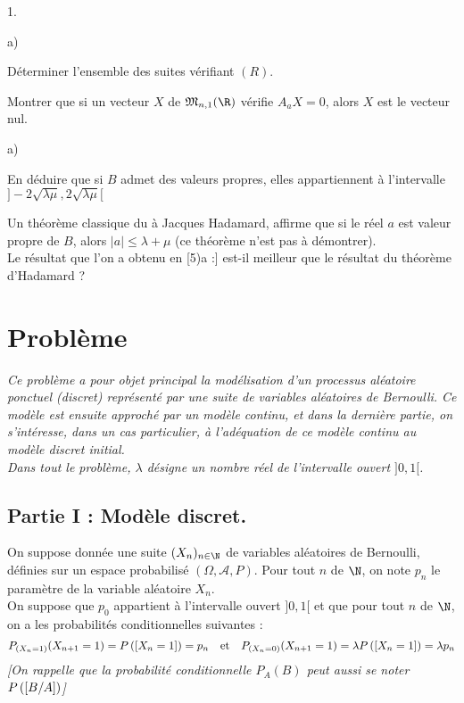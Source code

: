 \documentclass[11pt]{article}%
\begin{document}
\begin{noliste}{1.}
\begin{noliste}{a)}
 \setlength{\itemsep}{2mm}
\item Déterminer l'ensemble des suites vérifiant $(R)$.

\item Montrer que si un vecteur $X$ de $\mathfrak{M}_{n,1}(\R)$ vérifie
$A_{a}X = 0$, alors $X$ est le vecteur nul.
\end{noliste}

\item 

\begin{noliste}{a)}
 \setlength{\itemsep}{2mm}
\item En déduire que si $B$ admet des valeurs propres, elles
appartiennent à
l'intervalle $]-2\sqrt{\lambda \mu },2\sqrt{\lambda \mu }[$

\item Un théorème classique du à Jacques Hadamard, affirme que si le
réel $a$
est valeur propre de $B$, alors $|a|\leq \lambda + \mu $ (ce théorème
n'est pas à démontrer).\\
Le résultat que l'on a obtenu en [5)a :] est-il meilleur que le
résultat du théorème d'Hadamard ?
\end{noliste}
\end{noliste}

\section*{Problème}

\textsl{Ce problème a pour objet principal la modélisation d'un
processus aléatoire ponctuel (discret) représenté par une suite de
variables aléatoires de Bernoulli. Ce modèle est ensuite approché par
un modèle continu, et dans la
dernière partie, on s'intéresse, dans un cas particulier, à
l'adéquation de ce modèle continu au modèle discret initial.} \\
\textsl{Dans tout le problème, $\lambda $ désigne un nombre réel de
l'intervalle ouvert $]0,1[$.} \vspace{0.5cm}

\subsection*{Partie I : Modèle discret.}

On suppose donnée une suite $(X_{n})_{n\in \N}$ de variables aléatoires
de Bernoulli, définies sur un espace probabilisé
$(\Omega,\mathcal{A},P)$. Pour tout $n$ de $\N$, on note $p_{n}$ le
paramètre de la
variable aléatoire $X_{n}$.\\
On suppose que $p_{0}$ appartient à l'intervalle ouvert $]0,1[$ et que
pour
tout $n$ de $\N$, on a les probabilités conditionnelles suivantes : 
\[
P_{(X_{n} = 1)}(X_{n + 1} = 1) = P\left(\left[ {X_{n} = 1} \right]\right) =
p_{n}\quad \text{et}\quad
P_{(X_{n} = 0)}(X_{n + 1} = 1) = \lambda P\left(\left[ {X_{n} = 1} \right]\right) =
\lambda p_{n}
\]
\textsl{[On rappelle que la probabilité conditionnelle $P_{A}(B)$ peut
aussi
se noter $P\left(\left[ {B/A} \right]\right)$]}
\end{document}
